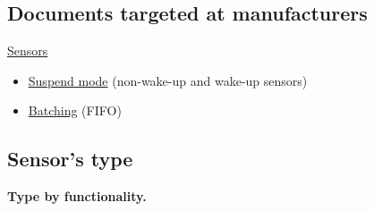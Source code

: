 \subsection{Documents targeted at manufacturers}

\href{https://source.android.com/devices/sensors/index.html}{Sensors}
\begin{itemize}
\item \href{https://source.android.com/devices/sensors/suspend-mode.html}
  {Suspend mode} (non-wake-up and wake-up sensors)
  
\item \href{https://source.android.com/devices/sensors/batching.html}
  {Batching} (FIFO)
\end{itemize}


\subsection{Sensor's type}

\textbf{Type by functionality.} 
\vspace*{.5cm}

